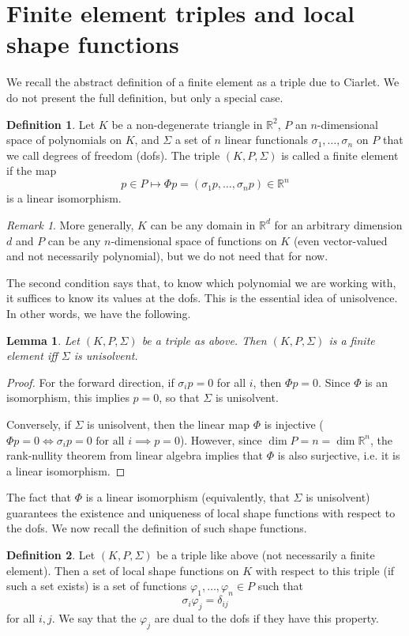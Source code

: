 \documentclass{article}
\theoremstyle{plain}
\newtheorem{lemma}{Lemma}
\theoremstyle{definition}
\newtheorem{definition}{Definition}
\theoremstyle{remark}
\newtheorem{remark}{Remark}
\begin{document}
\section{Finite element triples and local shape functions}\label{app:shape}
We recall the abstract definition of a finite element as a triple due to Ciarlet.
We do not present the full definition, but only a special case.
\begin{definition}
	Let $K$ be a non-degenerate triangle in $\mathbb R^2$, $P$ an $n$-dimensional space of polynomials on $K$, and $\Sigma$ a set of $n$ linear functionals $\sigma_1,\dots,\sigma_n$ on $P$ that we call degrees of freedom (dofs).
	The triple $(K, P, \Sigma)$ is called a finite element if the map \[p \in P \mapsto \Phi p = (\sigma_1p,\dots,\sigma_np) \in \mathbb R^n\] is a linear isomorphism.
\end{definition}

\begin{remark}
	More generally, $K$ can be any domain in $\mathbb R^d$ for an arbitrary dimension $d$ and $P$ can be any $n$-dimensional space of functions on $K$ (even vector-valued and not necessarily polynomial), but we do not need that for now.
\end{remark}

The second condition says that, to know which polynomial we are working with, it suffices to know its values at the dofs.
This is the essential idea of unisolvence.
In other words, we have the following.

\begin{lemma}
	Let $(K, P, \Sigma)$ be a triple as above.
	Then $(K, P, \Sigma)$ is a finite element iff $\Sigma$ is unisolvent.
\end{lemma}
\begin{proof}
	For the forward direction, if $\sigma_i p = 0$ for all $i$, then $\Phi p = 0$.
	Since $\Phi$ is an isomorphism, this implies $p = 0$, so that $\Sigma$ is unisolvent.

	Conversely, if $\Sigma$ is unisolvent, then the linear map $\Phi$ is injective ($\Phi p = 0 \iff \sigma_i p = 0 \text{ for all } i \implies p = 0$).
	However, since $\dim P = n = \dim \mathbb R^n$, the rank-nullity theorem from linear algebra implies that $\Phi$ is also surjective, i.e. it is a linear isomorphism.
\end{proof}

The fact that $\Phi$ is a linear isomorphism (equivalently, that $\Sigma$ is unisolvent) guarantees the existence and uniqueness of local shape functions with respect to the dofs.
We now recall the definition of such shape functions.
\begin{definition}
	Let $(K, P, \Sigma)$ be a triple like above (not necessarily a finite element).
	Then a set of local shape functions on $K$ with respect to this triple (if such a set exists) is a set of functions $\varphi_1,\dots,\varphi_n \in P$ such that \[\sigma_i\varphi_j = \delta_{ij}\] for all $i,j$.
	We say that the $\varphi_j$ are dual to the dofs if they have this property.
\end{definition}
\end{document}
